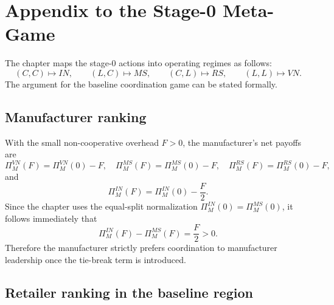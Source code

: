 \section{Appendix to the Stage-0 Meta-Game}
\label{app:meta_game}

The chapter maps the stage-0 actions into operating regimes as follows:
\begin{equation}
 (C,C)\mapsto IN,
 \qquad
 (L,C)\mapsto MS,
 \qquad
 (C,L)\mapsto RS,
 \qquad
 (L,L)\mapsto VN.
\end{equation}
The argument for the baseline coordination game can be stated formally.

\subsection{Manufacturer ranking}

With the small non-cooperative overhead $F>0$, the manufacturer's net payoffs are
\begin{equation}
 \Pi_M^{VN}(F)=\Pi_M^{VN}(0)-F,
 \quad
 \Pi_M^{MS}(F)=\Pi_M^{MS}(0)-F,
 \quad
 \Pi_M^{RS}(F)=\Pi_M^{RS}(0)-F,
\end{equation}
and
\begin{equation}
 \Pi_M^{IN}(F)=\Pi_M^{IN}(0)-\frac{F}{2}.
\end{equation}
Since the chapter uses the equal-split normalization
$\Pi_M^{IN}(0)=\Pi_M^{MS}(0)$, it follows immediately that
\begin{equation}
 \Pi_M^{IN}(F)-\Pi_M^{MS}(F)=\frac{F}{2}>0.
\end{equation}
Therefore the manufacturer strictly prefers coordination to manufacturer
leadership once the tie-break term is introduced.

\subsection{Retailer ranking in the baseline region}

